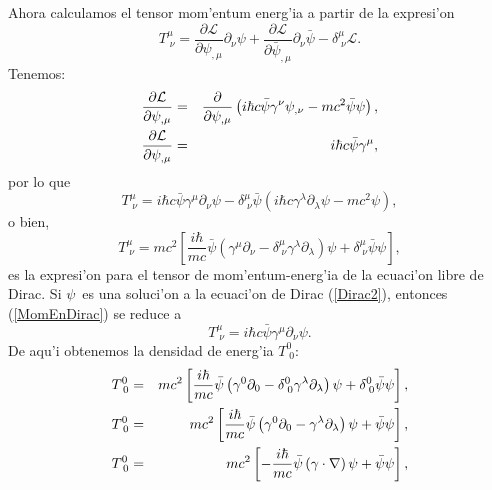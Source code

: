 Ahora calculamos el tensor mom'entum energ'ia a partir de la
expresi'on 
\begin{equation}
T_{\;\nu }^{\mu }=\frac{\partial \mathcal{L}}{\partial \psi _{,\mu }}%
\partial _\nu \psi +\frac{\partial \mathcal{L}}{\partial \bar{\psi}_{,\mu }%
}\partial _\nu \bar{\psi}-\delta _{\;\nu }^{\mu }\mathcal{L}.
\end{equation}
Tenemos: 
\begin{eqnarray*}
\frac{\partial \mathcal{L}}{\partial \psi _{,\mu }} &=&\frac{\partial }{%
\partial \psi _{,\mu }}\left( i\hbar c\bar{\psi}\gamma^\nu \psi _{,\nu
}-mc^2\bar{\psi}\psi \right) , \\
\frac{\partial \mathcal{L}}{\partial \psi _{,\mu }} &=&i\hbar c\bar{\psi}%
\gamma^{\mu },
\end{eqnarray*}
por lo que 
\begin{equation}
T_{\;\nu }^{\mu }=i\hbar c\bar{\psi}\gamma^{\mu }\partial _\nu \psi
-\delta _{\;\nu }^{\mu }\bar{\psi}\left( i\hbar c\gamma^{\lambda
}\partial _{\lambda }\psi -mc^2\psi \right) ,
\end{equation}
o bien, 
\begin{equation}
T_{\;\nu }^{\mu }=mc^2\left[ \frac{i\hbar }{mc}\bar{\psi}\left( \gamma
^{\mu }\partial _\nu -\delta _{\;\nu }^{\mu }\gamma^{\lambda }\partial
_{\lambda }\right) \psi +\delta _{\;\nu }^{\mu }\bar{\psi}\psi \right] ,
\label{MomEnDirac}
\end{equation}
es la expresi'on para el tensor de mom'entum-energ'ia de la
ecuaci'on libre de Dirac. Si $\psi $\ es una soluci'on a la
ecuaci'on de Dirac (\ref{Dirac2}), entonces (\ref{MomEnDirac}) se reduce
a 
\begin{equation}
T_{\;\nu }^{\mu }=i\hbar c\bar{\psi}\gamma^{\mu }\partial _\nu \psi .
\label{MomEnDirac2}
\end{equation}
De aqu'i obtenemos la densidad de energ'ia $T_{\;0}^0$: 
\begin{eqnarray*}
T_{\;0}^0 &=&mc^2\left[ \frac{i\hbar }{mc}\bar{\psi}\left( \gamma
^0\partial _0-\delta _{\;0}^0\gamma^{\lambda }\partial _{\lambda
}\right) \psi +\delta _{\;0}^0\bar{\psi}\psi \right] , \\
T_{\;0}^0 &=&mc^2\left[ \frac{i\hbar }{mc}\bar{\psi}\left( \gamma
^0\partial _0-\gamma^{\lambda }\partial _{\lambda }\right) \psi +\bar{%
\psi}\psi \right] , \\
T_{\;0}^0 &=&mc^2\left[ -\frac{i\hbar }{mc}\bar{\psi}\left( {\bf %
\gamma }\cdot \nabla \right) \psi +\bar{\psi}\psi \right] ,
\end{eqnarray*}
